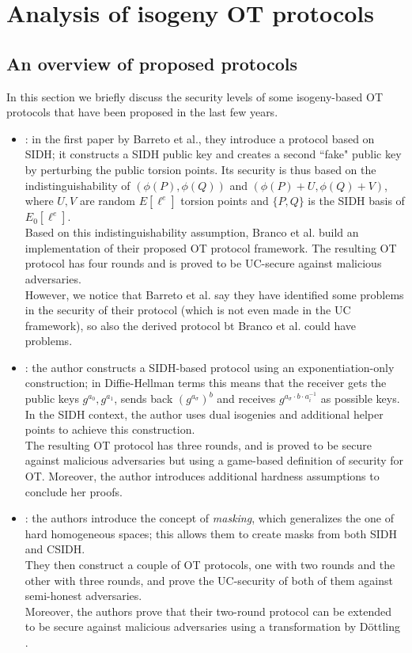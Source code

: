 \chapter{Analysis of isogeny OT protocols}

\section{An overview of proposed protocols}
In this section we briefly discuss the security levels of some isogeny-based OT protocols that have been proposed in the last few years.

\begin{itemize}
    \item \cite{Barreto, Branco}: in the first paper by Barreto et al., they introduce a protocol based on SIDH; it constructs a SIDH public key and creates a second ``fake" public key by perturbing the public torsion points. Its security is thus based on the indistinguishability of $(\phi(P),\phi(Q))$ and $(\phi(P)+U,\phi(Q)+V)$, where $U,V$ are random $E[\ell^e]$ torsion points and $\{P,Q\}$ is the SIDH basis of $E_0[\ell^e]$.\\
    Based on this indistinguishability assumption, Branco et al. build an implementation of their proposed OT protocol framework. The resulting OT protocol has four rounds and is proved to be UC-secure against malicious adversaries.\\
    However, we notice that Barreto et al. say they have identified some problems in the security of their protocol (which is not even made in the UC framework), so also the derived protocol bt Branco et al. could have problems.
    
    \item \cite{Vitse}: the author constructs a SIDH-based protocol using an exponentiation-only construction; in Diffie-Hellman terms this means that the receiver gets the public keys $g^{a_0},g^{a_1}$, sends back $\left(g^{a_\sigma}\right)^b$ and receives $g^{a_\sigma\cdot b\cdot a_i^{-1}}$ as possible keys. In the SIDH context, the author uses dual isogenies and additional helper points to achieve this construction.\\
    The resulting OT protocol has three rounds, and is proved to be secure against malicious adversaries but using a game-based definition of security for OT. Moreover, the author introduces additional hardness assumptions to conclude her proofs.
    
    \item \cite{dSG_Orsini}: the authors introduce the concept of \emph{masking}, which generalizes the one of hard homogeneous spaces; this allows them to create masks from both SIDH and CSIDH.\\
    They then construct a couple of OT protocols, one with two rounds and the other with three rounds, and prove the UC-security of both of them against semi-honest adversaries.\\
    Moreover, the authors prove that their two-round protocol can be extended to be secure against malicious adversaries using a transformation by D{\"o}ttling \cite{Dottling}.
    

\end{itemize}
